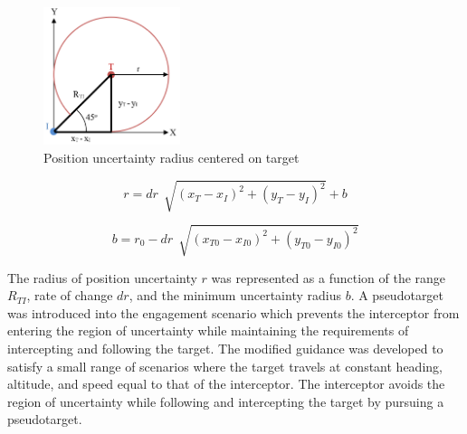 \documentclass[conference]{IEEEtran}
\begin{document}
\begin{figure}[H]
	\centering
	\includegraphics[width=4cm]{45deguncert.PNG}
	\caption{Position uncertainty radius centered on target}
	\label{fig:uncertrad}
\end{figure}



\begin{equation} \label{eq:uncert}
r = dr \,\sqrt[]{(x_T - x_I)^2+(y_T - y_I)^2}+b
\end{equation}



\begin{equation} \label{beq}
b = r_0-dr \,\sqrt[]{(x_{T0} - x_{I0})^2+(y_{T0} - y_{I0})^2}
\end{equation}

The radius of position uncertainty $r$ was represented as a function of the range $R_{TI}$, rate of change $dr$, and the minimum uncertainty radius $b$. A pseudotarget was introduced into the engagement scenario which prevents the interceptor from entering the region of uncertainty while maintaining the requirements of intercepting and following the target. The modified guidance was developed to satisfy a small range of scenarios where the target travels at constant heading, altitude, and speed equal to that of the interceptor. The interceptor avoids the region of uncertainty while following and intercepting the target by pursuing a pseudotarget. 
\end{document}
